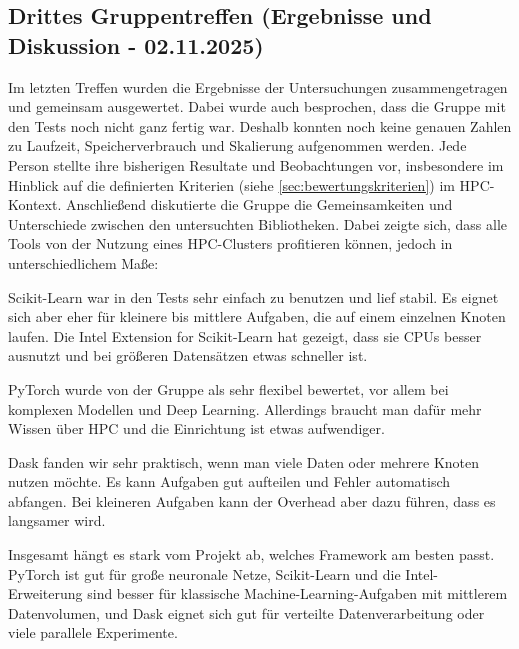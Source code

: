 \documentclass{article}
\begin{document}
\subsection*{Drittes Gruppentreffen (Ergebnisse und Diskussion - 02.11.2025)}
Im letzten Treffen wurden die Ergebnisse der Untersuchungen zusammengetragen 
und gemeinsam ausgewertet. Dabei wurde auch besprochen, dass die Gruppe mit 
den Tests noch nicht ganz fertig war. Deshalb konnten noch keine genauen 
Zahlen zu Laufzeit, Speicherverbrauch 
und Skalierung aufgenommen werden. Jede Person stellte ihre bisherigen 
Resultate und Beobachtungen vor, insbesondere im Hinblick auf die definierten 
Kriterien (siehe \ref{sec:bewertungskriterien}) im HPC-Kontext. Anschließend 
diskutierte die Gruppe die Gemeinsamkeiten und Unterschiede zwischen den 
untersuchten Bibliotheken. Dabei zeigte sich, dass alle Tools von der Nutzung 
eines HPC-Clusters profitieren können, jedoch in unterschiedlichem Maße:

Scikit-Learn war in den Tests sehr einfach zu benutzen und lief stabil. Es 
eignet sich aber eher für kleinere bis mittlere Aufgaben, die auf einem 
einzelnen Knoten laufen. Die Intel Extension for Scikit-Learn hat gezeigt, 
dass sie CPUs besser ausnutzt und bei größeren Datensätzen etwas schneller ist.

PyTorch wurde von der Gruppe als sehr flexibel bewertet, vor allem bei 
komplexen Modellen und Deep Learning. Allerdings braucht man dafür mehr 
Wissen über HPC und die Einrichtung ist etwas aufwendiger.

Dask fanden wir sehr praktisch, wenn man viele Daten oder mehrere Knoten 
nutzen möchte. Es kann Aufgaben gut aufteilen und Fehler automatisch abfangen. 
Bei kleineren Aufgaben kann der Overhead 
aber dazu führen, dass es langsamer wird.

Insgesamt hängt es stark vom Projekt ab, welches Framework am besten passt. 
PyTorch ist gut für große neuronale Netze, Scikit-Learn und die 
Intel-Erweiterung sind besser für klassische Machine-Learning-Aufgaben mit 
mittlerem Datenvolumen, und Dask eignet sich gut für verteilte 
Datenverarbeitung oder viele parallele Experimente.
\end{document}
